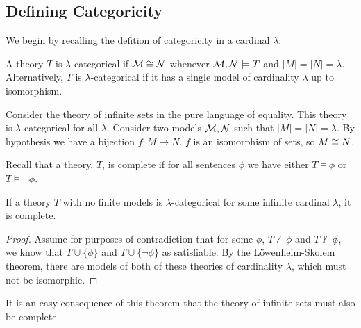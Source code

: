 \subsection{Defining Categoricity}

We begin by recalling the defition of categoricity in a cardinal \(\lambda\):

\begin{definition}\label{def_categoricity}
A theory \(T\) is \(\lambda\)-categorical if \(\mathcal{M} \cong \mathcal{N}\) whenever \(\mathcal{M}, \mathcal{N} \models T\) and \(|M| = |N| = \lambda\).
Alternatively, \(T\) is \(\lambda\)-categorical if it has a single model of cardinality \(\lambda\) up to isomorphism. 
\end{definition}

\begin{example}\label{example_categoricity_sets}
Consider the theory of infinite sets in the pure language of equality. 
This theory is \(\lambda\)-categorical for all \(\lambda\).
Consider two models \(\mathcal{M}, \mathcal{N}\) such that \(|M|=|N|=\lambda\). 
By hypothesis we have a bijection \(f: M \to N\). 
\(f\) is an isomorphism of sets, so \(M \cong N\).
\end{example}

\begin{definition}
Recall that a theory, \(T\), is complete if for all sentences \(\phi\) we have either \(T \models \phi\) or \(T \models \neg \phi\). 
\end{definition}

\begin{theorem}\label{vaughts_test}
If a theory \(T\) with no finite models is \(\lambda\)-categorical for some infinite cardinal \(\lambda\), it is complete.
\end{theorem}

\begin{proof}
Assume for purposes of contradiction that for some \(\phi\), \(T \not \models \phi\) and \(T \not \models \not \phi\), we know that \(T \cup \{\phi\}\) and \(T \cup \{\neg \phi\}\) as satisfiable. 
By the L\"owenheim-Skolem theorem, there are models of both of these theories of cardinality \(\lambda\), which must not be isomorphic. 
\end{proof}

It is an easy consequence of this theorem that the theory of infinite sets must also be complete. 

